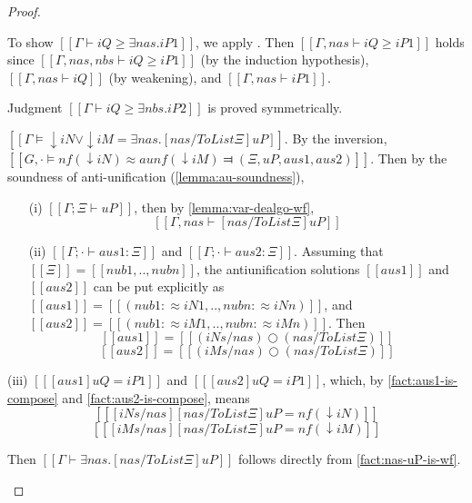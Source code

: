 \begin{proof}
\begin{caseof}
     To show $[[Γ ⊢ iQ ≥ ∃nas.iP1]]$, we apply
     .
     Then $[[Γ, nas ⊢ iQ ≥ iP1]]$ holds since
     $[[Γ, {nas}, {nbs} ⊢ iQ ≥ iP1]]$ (by the induction hypothesis),
     $[[Γ, nas ⊢ iQ]]$ (by weakening), and $[[Γ, nas ⊢ iP1]]$.

     Judgment $[[Γ ⊢ iQ ≥ ∃nbs.iP2]]$ is proved symmetrically.
  \item $[[Γ ⊨ ↓iN ∨ ↓iM = ∃nas.[nas / ToList Ξ]uP]]$.
    By the inversion, $[[G,· ⊨ nf(↓iN) ≈au nf(↓iM) ⫤ (Ξ, uP, aus1, aus2)]]$.
    Then by the soundness of anti-unification (\cref{lemma:au-soundness}),
    \begin{enumerate}
    \item[(i)] $[[Γ ; Ξ ⊢ uP]]$, then
      by \cref{lemma:var-dealgo-wf},
      \begin{equation} \label{fact:nas-uP-is-wf} [[Γ, nas ⊢ [nas / ToList Ξ]uP]] \end{equation}
    \item[(ii)] $[[Γ ; · ⊢ aus1 : Ξ]]$ and $[[Γ ; · ⊢ aus2 : Ξ]]$.
      Assuming that $[[Ξ]] = [[nub1,..,nubn]]$,
      the antiunification solutions $[[aus1]]$ and $[[aus2]]$ can be
      put explicitly as $[[aus1]] = [[(nub1 :≈ iN1,..,nubn :≈ iNn)]]$,
      and $[[aus2]] = [[(nub1 :≈ iM1,..,nubn :≈ iMn)]]$.
      Then
      \begin{equation}
        \label{fact:aus1-is-compose}
        [[ aus1 ]] = [[ (iNs / nas) ○ (nas / ToList Ξ) ]] 
      \end{equation}
      \begin{equation}
        \label{fact:aus2-is-compose}
        [[ aus2 ]] = [[ (iMs / nas) ○ (nas / ToList Ξ) ]]
      \end{equation}
    \end{enumerate}
  \item[(iii)] $[[ [aus1] uQ = iP1 ]]$ and $[[ [aus2] uQ = iP1 ]]$,
    which, by \ref{fact:aus1-is-compose} and \ref{fact:aus2-is-compose},
    means
    \begin{equation}
      \label{fact:sub-sub-uP-iN}
      [[ [iNs / nas][nas / ToList Ξ]uP = nf(↓iN) ]]
    \end{equation}
    \begin{equation}
      \label{fact:sub-sub-uP-iM}
      [[ [iMs / nas][nas / ToList Ξ]uP = nf(↓iM) ]]
    \end{equation}

    Then $[[Γ ⊢ ∃nas.[nas / ToList Ξ]uP]]$
    follows directly from \ref{fact:nas-uP-is-wf}.


\end{caseof}
\end{proof}
